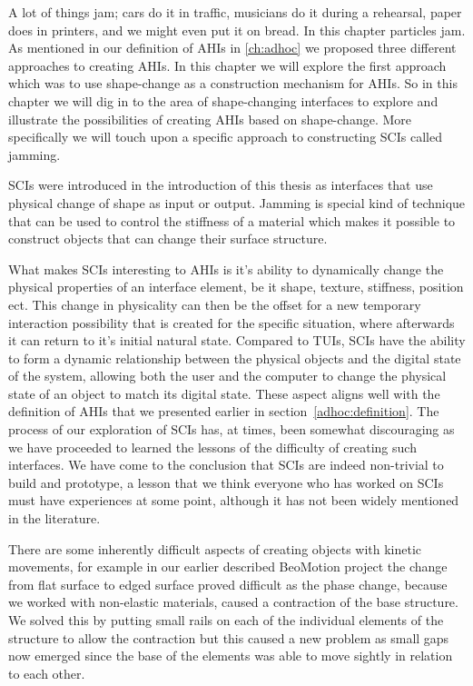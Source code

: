 
A lot of things jam; cars do it in traffic, musicians do it during a rehearsal, paper does in printers, and we might even put it on bread.
In this chapter particles jam.
\blank
As mentioned in our definition of AHIs in \autoref{ch:adhoc} we proposed three different approaches to creating AHIs.
In this chapter we will explore the first approach which was to use shape-change as a construction mechanism for AHIs.
So in this chapter we will dig in to the area of shape-changing interfaces to explore and illustrate the possibilities of creating AHIs based on shape-change.
More specifically we will touch upon a specific approach to constructing SCIs called jamming.

SCIs were introduced in the introduction of this thesis as interfaces that use physical change of shape as input or output.
Jamming is special kind of technique that can be used to control the stiffness of a material which makes it possible to construct objects that can change their surface structure.

What makes SCIs interesting to AHIs is it's ability to dynamically change the physical properties of an interface element, be it shape, texture, stiffness, position ect.
This change in physicality can then be the offset for a new temporary interaction possibility that is created for the specific situation, where afterwards it can return to it's initial natural state.
Compared to TUIs, SCIs have the ability to form a dynamic relationship between the physical objects and the digital state of the system, allowing both the user and the computer to change the physical state of an object to match its digital state.
These aspect aligns well with the definition of AHIs that we presented earlier in section~\ref{adhoc:definition}.
\blank
The process of our exploration of SCIs has, at times, been somewhat discouraging as we have proceeded to learned the lessons of the difficulty of creating such interfaces.
We have come to the conclusion that SCIs are indeed non-trivial to build and prototype, a lesson that we think everyone who has worked on SCIs must have experiences at some point, although it has not been widely mentioned in the literature. 

There are some inherently difficult aspects of creating objects with kinetic movements, for example in our earlier described BeoMotion project the change from flat surface to edged surface proved difficult as the phase change, because we worked with non-elastic materials, caused a contraction of the base structure.
We solved this by putting small rails on each of the individual elements of the structure to allow the contraction but this caused a new problem as small gaps now emerged since the base of the elements was able to move sightly in relation to each other.


